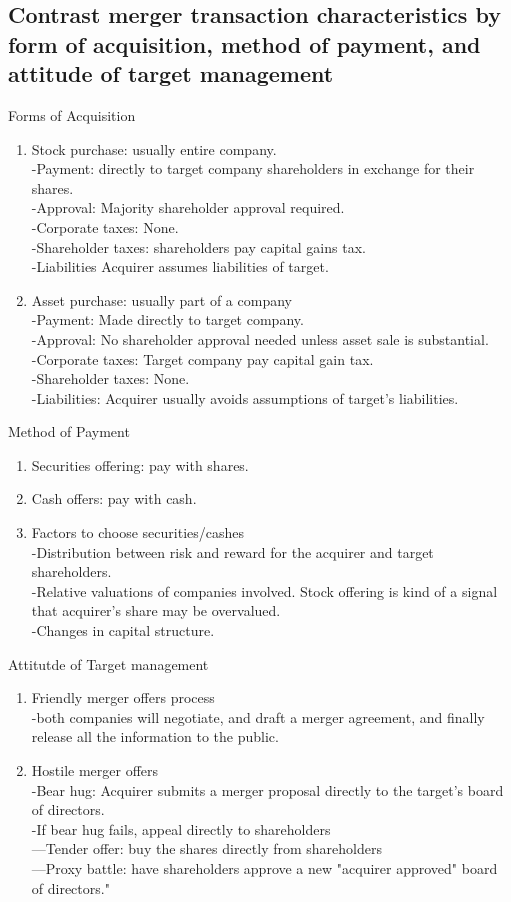 \documentclass{article}
\newcommand{\be}{\begin{enumerate}}
\newcommand{\ee}{\end{enumerate}}
\begin{document}
\subsection{Contrast merger transaction characteristics by form of acquisition,
method of payment, and attitude of target management}
Forms of Acquisition
\be
    \item Stock purchase: usually entire company.
        \\-Payment: directly to target company shareholders in exchange
        for their shares.
        \\-Approval: Majority shareholder approval required.
        \\-Corporate taxes: None.
        \\-Shareholder taxes: shareholders pay capital gains tax.
        \\-Liabilities Acquirer assumes liabilities of target.
    \item Asset purchase: usually part of a company
        \\-Payment: Made directly to target company.
        \\-Approval: No shareholder approval needed unless asset sale is substantial.
        \\-Corporate taxes: Target company pay capital gain tax.
        \\-Shareholder taxes: None.
        \\-Liabilities: Acquirer usually avoids assumptions of target's liabilities.
\ee
Method of Payment
\be
    \item Securities offering: pay with shares.
    \item Cash offers: pay with cash.
    \item Factors to choose securities/cashes
        \\-Distribution between risk and reward for the acquirer and target
        shareholders.
        \\-Relative valuations of companies involved. Stock offering is kind of
        a signal that acquirer's share may be overvalued.
        \\-Changes in capital structure.
\ee
Attitutde of Target management
\be
    \item Friendly merger offers process
        \\-both companies will negotiate, and draft a merger agreement, and 
        finally release all the information to the public.
    \item Hostile merger offers
        \\-Bear hug: Acquirer submits a merger proposal directly to the target's
        board of directors.
        \\-If bear hug fails, appeal directly to shareholders
        \\---Tender offer: buy the shares directly from shareholders
        \\---Proxy battle: have shareholders approve a new "acquirer approved" board
        of directors."
\ee
\end{document}
